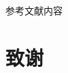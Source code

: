 \documentclass[a4paper]{book}
\begin{document}

\backmatter     %
\begin{thebibliography}{99}
参考文献内容
 \end{thebibliography}
\chapter[致谢]{致\quad 谢}
\end{document}
